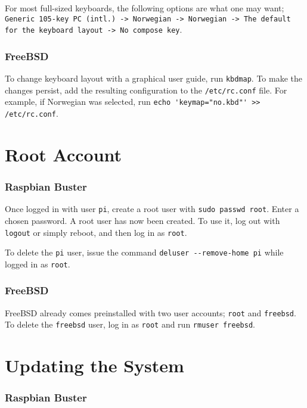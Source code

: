 For most full-sized keyboards, the following options are what one may want; \lstinline{Generic 105-key PC (intl.) -> Norwegian -> Norwegian -> The default for the keyboard layout -> No compose key}.

\subsubsection{FreeBSD}

To change keyboard layout with a graphical user guide, run \lstinline{kbdmap}. To make the changes persist, add the resulting configuration to the \lstinline{/etc/rc.conf} file. For example, if Norwegian was selected, run \lstinline{echo 'keymap="no.kbd"' >> /etc/rc.conf}.


\section{Root Account} \label{root_account}

\subsubsection{Raspbian Buster}

Once logged in with user \lstinline{pi}, create a root user with \lstinline{sudo passwd root}. Enter a chosen password. A root user has now been created. To use it, log out with \lstinline{logout} or simply reboot, and then log in as \lstinline{root}.

To delete the \lstinline{pi} user, issue the command \lstinline{deluser --remove-home pi} while logged in as \lstinline{root}.

\subsubsection{FreeBSD}

FreeBSD already comes preinstalled with two user accounts; \lstinline{root} and \lstinline{freebsd}. To delete the \lstinline{freebsd} user, log in as \lstinline{root} and run \lstinline{rmuser freebsd}.


\section{Updating the System} \label{update_system}

\subsubsection{Raspbian Buster}

